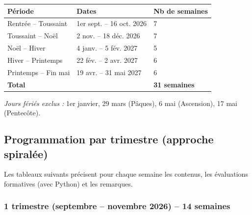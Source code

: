 \documentclass[a4paper,12pt]{article}
\begin{document}
\begin{center}
    \begin{tabular}{|C{3.5cm}|C{5cm}|C{2.5cm}|}
        \hline
        \textbf{Période} & \textbf{Dates} & \textbf{Nb de semaines} \\
        \hline
        Rentrée – Toussaint & 1er sept. – 16 oct. 2026 & 7 \\
        Toussaint – Noël & 2 nov. – 18 déc. 2026 & 7 \\
        Noël – Hiver & 4 janv. – 5 fév. 2027 & 5 \\
        Hiver – Printemps & 22 fév. – 2 avr. 2027 & 6 \\
        Printemps – Fin mai & 19 avr. – 31 mai 2027 & 6 \\
        \hline
        \textbf{Total} & & \textbf{31 semaines} \\
        \hline
    \end{tabular}
\end{center}

\textit{Jours fériés exclus :} 1er janvier, 29 mars (Pâques), 6 mai (Ascension), 17 mai (Pentecôte).

\subsection{Programmation par trimestre (approche spiralée)}
Les tableaux suivants précisent pour chaque semaine les contenus, les évaluations formatives (avec Python) et les remarques.

\newpage
\subsubsection{1 trimestre (septembre – novembre 2026) – 14 semaines}
\end{document}
